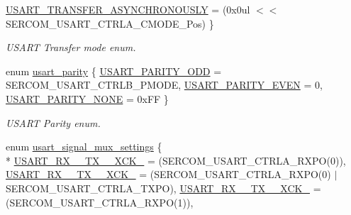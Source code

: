 \begin{DoxyCompactItemize}
\hyperlink{group__asfdoc__sam0__sercom__usart__group_gga7ff4d85053b8ea0904b5a57587b39c8fa5662e0cc82a73f113bb13ebb1e4c65ef}{U\+S\+A\+R\+T\+\_\+\+T\+R\+A\+N\+S\+F\+E\+R\+\_\+\+A\+S\+Y\+N\+C\+H\+R\+O\+N\+O\+U\+S\+L\+Y} = (0x0ul $<$$<$ S\+E\+R\+C\+O\+M\+\_\+\+U\+S\+A\+R\+T\+\_\+\+C\+T\+R\+L\+A\+\_\+\+C\+M\+O\+D\+E\+\_\+\+Pos)
 \}
\begin{DoxyCompactList}\small\item\em U\+S\+A\+R\+T Transfer mode enum. \end{DoxyCompactList}\item 
enum \hyperlink{group__asfdoc__sam0__sercom__usart__group_ga867cc5f0ea7d3bf651d68f0046cf6f41}{usart\+\_\+parity} \{ \hyperlink{group__asfdoc__sam0__sercom__usart__group_gga867cc5f0ea7d3bf651d68f0046cf6f41a69c6cdd4d354d3b26c8d2f09f49d2ede}{U\+S\+A\+R\+T\+\_\+\+P\+A\+R\+I\+T\+Y\+\_\+\+O\+D\+D} = S\+E\+R\+C\+O\+M\+\_\+\+U\+S\+A\+R\+T\+\_\+\+C\+T\+R\+L\+B\+\_\+\+P\+M\+O\+D\+E, 
\hyperlink{group__asfdoc__sam0__sercom__usart__group_gga867cc5f0ea7d3bf651d68f0046cf6f41ae5d22c99a30184aff19d77c1a970fb23}{U\+S\+A\+R\+T\+\_\+\+P\+A\+R\+I\+T\+Y\+\_\+\+E\+V\+E\+N} = 0, 
\hyperlink{group__asfdoc__sam0__sercom__usart__group_gga867cc5f0ea7d3bf651d68f0046cf6f41aecf52ec650226bdc63e12a21d3b5585d}{U\+S\+A\+R\+T\+\_\+\+P\+A\+R\+I\+T\+Y\+\_\+\+N\+O\+N\+E} = 0x\+F\+F
 \}
\begin{DoxyCompactList}\small\item\em U\+S\+A\+R\+T Parity enum. \end{DoxyCompactList}\item 
enum \hyperlink{group__asfdoc__sam0__sercom__usart__group_ga87bbdb9f7edb3f1866aeb498bf7c9077}{usart\+\_\+signal\+\_\+mux\+\_\+settings} \{ \\*
\hyperlink{group__asfdoc__sam0__sercom__usart__group_gga87bbdb9f7edb3f1866aeb498bf7c9077ab2330cf3ae7faacb7fd28678a77327f4}{U\+S\+A\+R\+T\+\_\+\+R\+X\+\_\+\_\+\+T\+X\+\_\+\_\+\+X\+C\+K\+\_} = (S\+E\+R\+C\+O\+M\+\_\+\+U\+S\+A\+R\+T\+\_\+\+C\+T\+R\+L\+A\+\_\+\+R\+X\+P\+O(0)), 
\hyperlink{group__asfdoc__sam0__sercom__usart__group_gga87bbdb9f7edb3f1866aeb498bf7c9077a4ad0f5cd921dd8c0787ebeba372bcc70}{U\+S\+A\+R\+T\+\_\+\+R\+X\+\_\+\_\+\+T\+X\+\_\+\_\+\+X\+C\+K\+\_} = (S\+E\+R\+C\+O\+M\+\_\+\+U\+S\+A\+R\+T\+\_\+\+C\+T\+R\+L\+A\+\_\+\+R\+X\+P\+O(0) $\vert$ S\+E\+R\+C\+O\+M\+\_\+\+U\+S\+A\+R\+T\+\_\+\+C\+T\+R\+L\+A\+\_\+\+T\+X\+P\+O), 
\hyperlink{group__asfdoc__sam0__sercom__usart__group_gga87bbdb9f7edb3f1866aeb498bf7c9077ac937b1e1063cc3d094c4534c022af703}{U\+S\+A\+R\+T\+\_\+\+R\+X\+\_\+\_\+\+T\+X\+\_\+\_\+\+X\+C\+K\+\_} = (S\+E\+R\+C\+O\+M\+\_\+\+U\+S\+A\+R\+T\+\_\+\+C\+T\+R\+L\+A\+\_\+\+R\+X\+P\+O(1)), 
$$
\end{DoxyCompactItemize}
